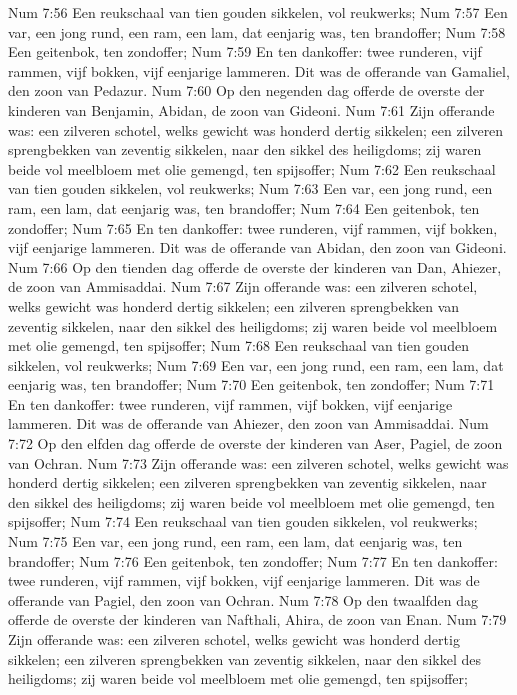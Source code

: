 Num 7:56  Een reukschaal van tien gouden sikkelen, vol reukwerks;
Num 7:57  Een var, een jong rund, een ram, een lam, dat eenjarig was, ten brandoffer;
Num 7:58  Een geitenbok, ten zondoffer;
Num 7:59  En ten dankoffer: twee runderen, vijf rammen, vijf bokken, vijf eenjarige lammeren. Dit was de offerande van Gamaliel, den zoon van Pedazur.
Num 7:60  Op den negenden dag offerde de overste der kinderen van Benjamin, Abidan, de zoon van Gideoni.
Num 7:61  Zijn offerande was: een zilveren schotel, welks gewicht was honderd dertig sikkelen; een zilveren sprengbekken van zeventig sikkelen, naar den sikkel des heiligdoms; zij waren beide vol meelbloem met olie gemengd, ten spijsoffer;
Num 7:62  Een reukschaal van tien gouden sikkelen, vol reukwerks;
Num 7:63  Een var, een jong rund, een ram, een lam, dat eenjarig was, ten brandoffer;
Num 7:64  Een geitenbok, ten zondoffer;
Num 7:65  En ten dankoffer: twee runderen, vijf rammen, vijf bokken, vijf eenjarige lammeren. Dit was de offerande van Abidan, den zoon van Gideoni.
Num 7:66  Op den tienden dag offerde de overste der kinderen van Dan, Ahiezer, de zoon van Ammisaddai.
Num 7:67  Zijn offerande was: een zilveren schotel, welks gewicht was honderd dertig sikkelen; een zilveren sprengbekken van zeventig sikkelen, naar den sikkel des heiligdoms; zij waren beide vol meelbloem met olie gemengd, ten spijsoffer;
Num 7:68  Een reukschaal van tien gouden sikkelen, vol reukwerks;
Num 7:69  Een var, een jong rund, een ram, een lam, dat eenjarig was, ten brandoffer;
Num 7:70  Een geitenbok, ten zondoffer;
Num 7:71  En ten dankoffer: twee runderen, vijf rammen, vijf bokken, vijf eenjarige lammeren. Dit was de offerande van Ahiezer, den zoon van Ammisaddai.
Num 7:72  Op den elfden dag offerde de overste der kinderen van Aser, Pagiel, de zoon van Ochran.
Num 7:73  Zijn offerande was: een zilveren schotel, welks gewicht was honderd dertig sikkelen; een zilveren sprengbekken van zeventig sikkelen, naar den sikkel des heiligdoms; zij waren beide vol meelbloem met olie gemengd, ten spijsoffer;
Num 7:74  Een reukschaal van tien gouden sikkelen, vol reukwerks;
Num 7:75  Een var, een jong rund, een ram, een lam, dat eenjarig was, ten brandoffer;
Num 7:76  Een geitenbok, ten zondoffer;
Num 7:77  En ten dankoffer: twee runderen, vijf rammen, vijf bokken, vijf eenjarige lammeren. Dit was de offerande van Pagiel, den zoon van Ochran.
Num 7:78  Op den twaalfden dag offerde de overste der kinderen van Nafthali, Ahira, de zoon van Enan.
Num 7:79  Zijn offerande was: een zilveren schotel, welks gewicht was honderd dertig sikkelen; een zilveren sprengbekken van zeventig sikkelen, naar den sikkel des heiligdoms; zij waren beide vol meelbloem met olie gemengd, ten spijsoffer;
